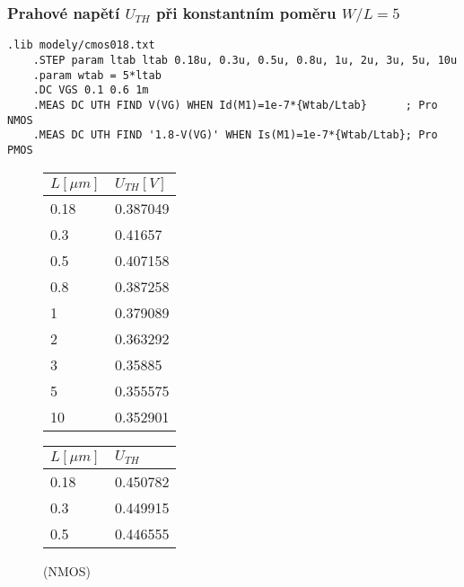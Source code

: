 
\subsubsection{Prahové napětí \(U_{TH}\) při konstantním poměru \(W/L = 5\)}
\begin{lstlisting}[language=Spice, caption={Použitý kod simulace při konstantním poměru \(W/L = 5\) pro NMOS}]
    .lib modely/cmos018.txt
    .STEP param ltab ltab 0.18u, 0.3u, 0.5u, 0.8u, 1u, 2u, 3u, 5u, 10u
    .param wtab = 5*ltab
    .DC VGS 0.1 0.6 1m
    .MEAS DC UTH FIND V(VG) WHEN Id(M1)=1e-7*{Wtab/Ltab}      ; Pro NMOS
    .MEAS DC UTH FIND '1.8-V(VG)' WHEN Is(M1)=1e-7*{Wtab/Ltab}; Pro PMOS
\end{lstlisting}

\begin{figure}[H]
    \begin{minipage}{0.5\textwidth}
        \centering
        \begin{tabular}{|l|l|}
            \hline
            \(L [\mu m]\) & \(U_{TH} [V]\)  \\ \hline
            0.18          & 0.387049	    \\ \hline
            0.3	          & 0.41657	        \\ \hline
            0.5	          & 0.407158	    \\ \hline
            0.8	          & 0.387258	    \\ \hline
            1	          & 0.379089	    \\ \hline
            2	          & 0.363292	    \\ \hline
            3	          & 0.35885	        \\ \hline
            5	          & 0.355575	    \\ \hline
            10	          & 0.352901	    \\ \hline
        \end{tabular}
        \caption{(NMOS)}
    \end{minipage}
    \hfill
    \begin{minipage}{0.5\textwidth}
        \centering
        \begin{tabular}{|l|l|}
            \hline
            \(L [\mu m]\) & \(U_{TH}\)   \\ \hline
            0.18          & 0.450782	 \\ \hline
            0.3	          & 0.449915	 \\ \hline
            0.5	          & 0.446555	 \\ \hline

\end{tabular}
\end{minipage}
\end{figure}
